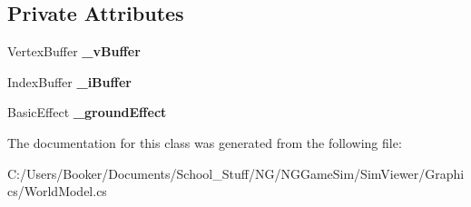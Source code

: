 \subsection*{Private Attributes}
\begin{DoxyCompactItemize}
\item 
\mbox{\label{class_n_g_sim_1_1_graphics_1_1_world_model_a7d4893168a767c6d81d2b1e336c28813}} 
Vertex\+Buffer {\bfseries \+\_\+v\+Buffer}
\item 
\mbox{\label{class_n_g_sim_1_1_graphics_1_1_world_model_ab17a769d0fb1d8d16654317e97c75763}} 
Index\+Buffer {\bfseries \+\_\+i\+Buffer}
\item 
\mbox{\label{class_n_g_sim_1_1_graphics_1_1_world_model_a7dfb48a096a1472aced902dd065151b5}} 
Basic\+Effect {\bfseries \+\_\+ground\+Effect}
\end{DoxyCompactItemize}


The documentation for this class was generated from the following file\+:\begin{DoxyCompactItemize}
\item 
C\+:/\+Users/\+Booker/\+Documents/\+School\+\_\+\+Stuff/\+N\+G/\+N\+G\+Game\+Sim/\+Sim\+Viewer/\+Graphics/World\+Model.\+cs\end{DoxyCompactItemize}
